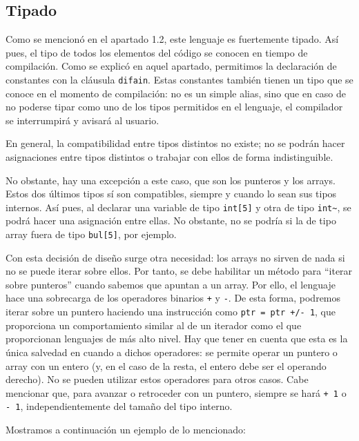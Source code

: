 \documentclass[10pt,a4paper]{article}
\begin{document}
\subsection{Tipado}
\label{subsec:Tipado}
Como se mencionó en el apartado 1.2, este lenguaje es fuertemente tipado. Así pues, el tipo de todos los elementos del código se conocen en tiempo de compilación. Como se explicó en aquel apartado, permitimos la declaración de constantes con la cláusula 
\texttt{\color{blue}difain}. Estas constantes también tienen un tipo que se conoce en el momento de compilación: no es un simple alias, sino que en caso de no poderse tipar como uno de los tipos permitidos en el lenguaje, el compilador se interrumpirá y avisará al usuario.

En general, la compatibilidad entre tipos distintos no existe; no se podrán hacer asignaciones entre tipos distintos o trabajar con ellos de forma indistinguible.

No obstante, hay una excepción a este caso, que son los punteros y los arrays. Estos dos últimos tipos sí son compatibles, siempre y cuando lo sean sus tipos internos. Así pues, al declarar una variable de tipo \texttt{\color{blue}int[5]} y otra de tipo \texttt{\color{blue}int\~}, se podrá hacer una asignación entre ellas. No obstante, no se podría si la de tipo array fuera de tipo \texttt{\color{blue}bul[5]}, por ejemplo.

Con esta decisión de diseño surge otra necesidad: los arrays no sirven de nada si no se puede iterar sobre ellos. Por tanto, se debe habilitar un método para ``iterar sobre punteros'' cuando sabemos que apuntan a un array. Por ello, el lenguaje hace una sobrecarga de los operadores binarios \texttt{\color{blue}+} y \texttt{\color{blue}-}. De esta forma, podremos iterar sobre un puntero haciendo una instrucción como \texttt{\color{blue}ptr = ptr +/- 1}, que proporciona un comportamiento similar al de un iterador como el que proporcionan lenguajes de más alto nivel. Hay que tener en cuenta que esta es la única salvedad en cuando a dichos operadores: se permite operar un puntero o array con un entero (y, en el caso de la resta, el entero debe ser el operando derecho). No se pueden utilizar estos operadores para otros casos. Cabe mencionar que, para avanzar o retroceder con un puntero, siempre se hará \texttt{\color{blue}+ 1} o \texttt{\color{blue}- 1}, independientemente del tamaño del tipo interno.

Mostramos a continuación un ejemplo de lo mencionado:
\end{document}
